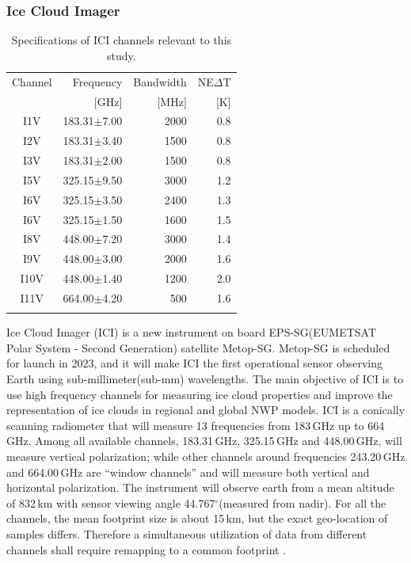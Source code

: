 \documentclass[amt, manuscript]{copernicus}
\begin{document}
\subsubsection{Ice Cloud Imager}
%
\begin{table}[t]	
	\caption{Specifications of ICI channels relevant to this study.}
	\label{tab:ICI_MWI_channels}
	\begin{tabular}{crrr}
		\tophline
		Channel & Frequency 	& Bandwidth  	&NE$\Delta$T	\\
				& [GHz]			& [MHz]			& [K]			\\
		\middlehline
		I1V&	183.31$\pm$7.00    & 2000 			& 0.8 		\\
		I2V&	183.31$\pm$3.40    & 1500 			& 0.8 		\\
		I3V&	183.31$\pm$2.00    & 1500			& 0.8 		\\
		I5V&	325.15$\pm$9.50    & 3000			& 1.2 		\\
		I6V&	325.15$\pm$3.50    & 2400			& 1.3 		\\
		I6V&	325.15$\pm$1.50    & 1600			& 1.5 		\\
		I8V&	448.00$\pm$7.20    & 3000			& 1.4 		\\
		I9V&	448.00$\pm$3.00    & 2000			& 1.6 		\\
		I10V&	448.00$\pm$1.40    & 1200			& 2.0 		\\
		I11V&	664.00$\pm$4.20    & \phantom{0}500	& 1.6 		\\		
		\bottomhline
	\end{tabular}
	\belowtable{} %
\end{table}

Ice Cloud Imager (ICI) is a new instrument on board EPS-SG(EUMETSAT Polar System - Second Generation) satellite Metop-SG. Metop-SG is scheduled for launch in 2023, and it will make ICI the first operational sensor observing Earth using sub-millimeter(sub-mm) wavelengths. The main objective of ICI is to use high frequency channels for measuring ice cloud properties and improve the representation of ice clouds in regional and global NWP models. ICI is a conically scanning radiometer that will measure 13 frequencies from 183\,GHz up to 664\, GHz.  Among all available channels, 183.31\,GHz, 325.15\,GHz and 448.00\,GHz, will measure vertical polarization;  while other channels around frequencies 243.20\,GHz and 664.00\,GHz are ``window channels'' and will measure both vertical and horizontal polarization. The instrument will observe earth from a mean altitude of 832\,km with sensor viewing angle 44.767$^\circ$(measured from nadir). For all the channels, the mean footprint size is about 15\,km, but the exact geo-location of samples differs. Therefore a simultaneous utilization of data from different channels shall require remapping to a common footprint \citep{eriksson:towar:20}.
\end{document}
